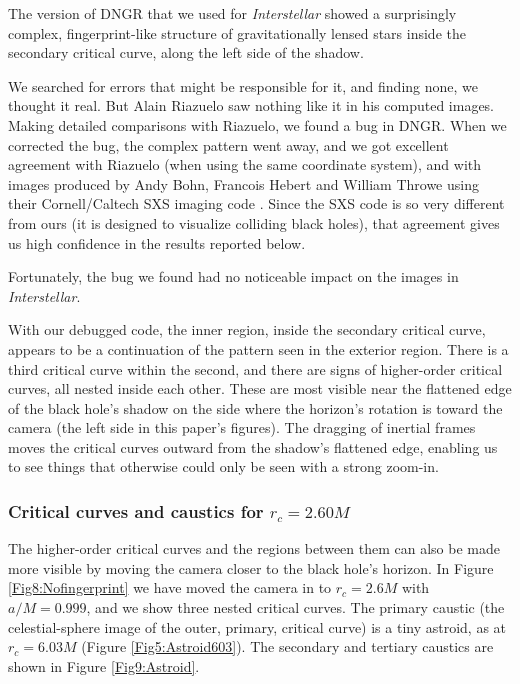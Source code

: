 \documentclass[12pt]{iopart}
\begin{document}
The version of DNGR that we used for {\it Interstellar} showed a surprisingly complex,
fingerprint-like structure of gravitationally lensed stars inside the secondary critical curve, along the left side of the shadow.  

We searched for errors that might be responsible for it, and finding none, we thought it real. But Alain Riazuelo \cite{RiazueloNoFingerprint} saw nothing like it in his computed images. 
Making detailed comparisons with Riazuelo, we found a bug in
DNGR. When we corrected the bug, the complex pattern went
away, and we got excellent agreement with
Riazuelo (when using the same coordinate system), and with
images produced by Andy Bohn, Francois Hebert
and William Throwe using their Cornell/Caltech SXS imaging code \cite{SXS}.  Since the SXS code is so 
very different from ours (it is designed to visualize colliding black holes), that agreement
gives us high confidence in the results reported below.  

Fortunately, the bug we found had no noticeable impact on the images in \emph{Interstellar}.

With our debugged code, the inner region, inside the secondary critical curve, appears to be a continuation of
the pattern seen in the exterior region. 
There is a third critical curve within the second,
and there are signs of higher-order critical curves, all nested inside each other.  These are 
most visible near the flattened edge of the black hole's shadow on the side where the horizon's rotation is
toward the camera (the left side in this paper's figures).  The dragging of inertial frames
moves the critical curves outward from the shadow's flattened edge, enabling us to see things that otherwise could only be seen with a strong zoom-in.

\subsubsection{Critical curves and caustics for $r_c=2.60M$}

The higher-order critical curves and the regions between them
can also be made more visible by moving the camera closer to the black hole's horizon.
In Figure \ref{Fig8:Nofingerprint} we have moved the camera in to $r_c=2.6M$ with $a/M=0.999$, and we show three nested critical 
curves. The primary caustic (the celestial-sphere image of the outer, primary, critical curve) is a tiny astroid, as at $r_c=6.03M$ (Figure \ref{Fig5:Astroid603}).  The secondary and tertiary
caustics are shown in Figure \ref{Fig9:Astroid}.  
\end{document}
